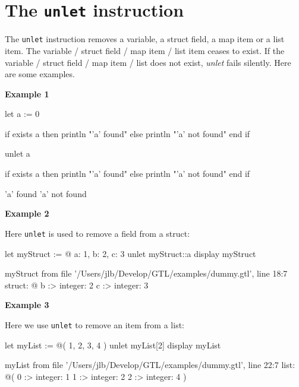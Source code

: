\documentclass[10pt,openright,twosides,final]{memoir}
\newcommand{\gtlinline}[1]{\colorbox{light-blue}{\lstinline[language=gtl]{#1}}}
\newcommand{\examplen}[1]{\vspace{.75em}\noindent\textbf{Example #1}\vspace{0em}}
\begin{document}
\section{The \texttt{unlet} instruction}

The \gtlinline{unlet} instruction removes a variable, a struct field, a map item or a list item. The variable / struct field / map item / list item ceases to exist. If the variable / struct field / map item / list does not exist, {\em unlet} fails silently. Here are some examples.

\examplen{1}
\begin{gtl}
let a := 0

if exists a then
  println "'a' found"
else
  println "'a' not found"
end if

unlet a

if exists a then
  println "'a' found"
else
  println "'a' not found"
end if
\end{gtl}

\begin{console}
'a' found
'a' not found
\end{console}


\examplen{2}

\noindent Here \gtlinline{unlet} is used to remove a field from a struct:

\begin{gtl}
let myStruct := @{ a: 1, b: 2, c: 3 }
unlet myStruct::a
display myStruct
\end{gtl} 

\begin{console}
myStruct from file '/Users/jlb/Develop/GTL/examples/dummy.gtl', line 18:7
    struct: @{
        b :>
            integer: 2
        c :>
            integer: 3
    }
\end{console}

\examplen{3}

\noindent Here we use \gtlinline{unlet} to remove an item from a list:

\begin{gtl}
let myList := @( 1, 2, 3, 4 )
unlet myList[2]
display myList
\end{gtl}

\begin{console}
myList from file '/Users/jlb/Develop/GTL/examples/dummy.gtl', line 22:7
    list: @(
        0 :>
            integer: 1
        1 :>
            integer: 2
        2 :>
            integer: 4
    )
\end{console}
\end{document}
